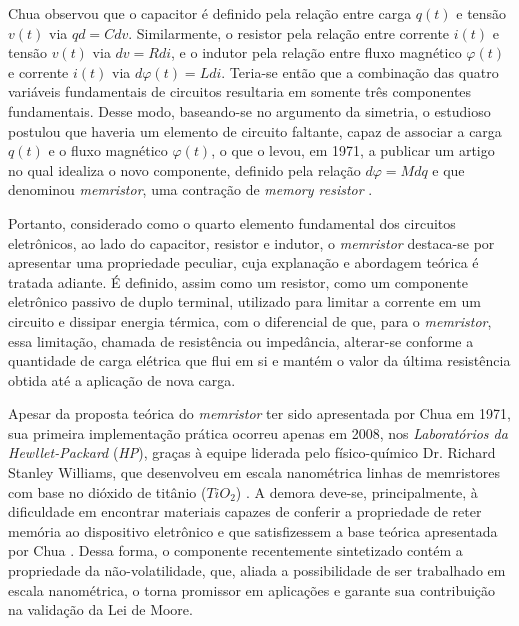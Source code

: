 \documentclass{ceel}
\begin{document}
\begin{multicols}{2}
Chua observou que o capacitor é definido pela relação entre carga $q(t)$ e tensão $v(t)$ via $qd=C dv$. Similarmente, o resistor pela relação entre corrente $i(t)$ e tensão $v(t)$ via $dv=R di$, e o indutor pela relação entre fluxo magnético $\varphi(t)$ e corrente $i(t)$ via $d\varphi(t)=L di$. Teria-se então que a combinação das quatro variáveis fundamentais de circuitos resultaria em somente três componentes fundamentais.
Desse modo, baseando-se no argumento da simetria, o estudioso postulou que haveria um elemento de circuito faltante, capaz de associar a carga $q(t)$ e o fluxo magnético $\varphi(t)$, o que o levou, em 1971, a publicar um artigo no qual idealiza o novo componente, definido pela relação $d\varphi=M dq$ e que denominou \emph{memristor}, uma contração de \emph{memory resistor} \cite{artigo}. 

Portanto, considerado como o quarto elemento fundamental dos circuitos eletrônicos, ao lado do capacitor, resistor e indutor, o \emph{memristor} destaca-se por apresentar uma propriedade peculiar, cuja explanação e abordagem teórica é tratada adiante. É definido, assim como um resistor, como um componente eletrônico passivo de duplo terminal, utilizado para limitar a corrente em um circuito e dissipar energia térmica, com o diferencial de que, para o \emph{memristor}, essa limitação, chamada de resistência ou impedância, alterar-se conforme a quantidade de carga elétrica que flui em si e mantém o valor da última resistência obtida até a aplicação de nova carga.

Apesar da proposta teórica do \emph{memristor} ter sido apresentada por Chua em 1971, sua primeira implementação prática ocorreu apenas em 2008, nos \emph{Laboratórios da Hewllet-Packard} (\emph{HP}), graças à equipe liderada pelo físico-químico Dr. Richard Stanley Williams, que desenvolveu em escala nanométrica linhas de memristores com base no dióxido de titânio ($TiO_2$) \cite{nature}. A demora deve-se, principalmente, à dificuldade em encontrar materiais capazes de conferir a propriedade de reter memória ao dispositivo eletrônico e que satisfizessem a base teórica apresentada por Chua \cite{artigo}.
Dessa forma, o componente recentemente sintetizado contém a propriedade da não-volatilidade, que, aliada a possibilidade de ser trabalhado em escala nanométrica, o torna promissor em aplicações e garante sua contribuição na validação da Lei de Moore.


\end{multicols}
\end{document}
